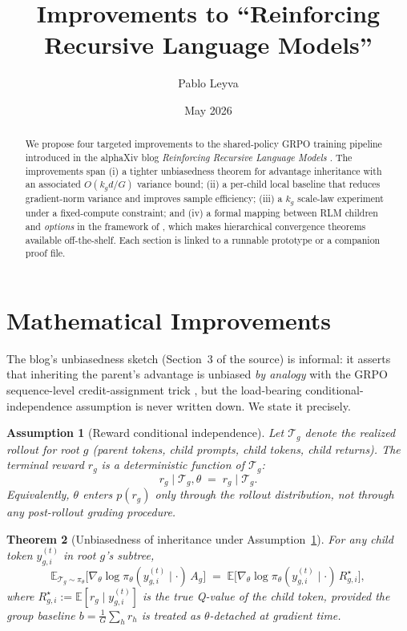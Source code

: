 \documentclass[11pt]{article}
\title{Improvements to ``Reinforcing Recursive Language Models''}
\author{Pablo Leyva}
\date{May 2026}
\newtheorem{theorem}{Theorem}
\newtheorem{assumption}[theorem]{Assumption}
\begin{document}
\maketitle

\begin{abstract}
We propose four targeted improvements to the shared-policy GRPO training
pipeline introduced in the alphaXiv blog \emph{Reinforcing Recursive Language
Models} \citep{zhang2026rlm,skyrl2025}. The improvements span (i) a tighter
unbiasedness theorem for advantage inheritance with an associated $O(k_g d / G)$
variance bound; (ii) a per-child local baseline that reduces gradient-norm
variance and improves sample efficiency; (iii) a $k_g$ scale-law experiment under
a fixed-compute constraint; and (iv) a formal mapping between RLM children and
\emph{options} in the framework of \citet{sutton1999options}, which makes
hierarchical convergence theorems available off-the-shelf. Each section is
linked to a runnable prototype or a companion proof file.
\end{abstract}

\section*{Mathematical Improvements}

The blog's unbiasedness sketch (Section~3 of the source) is informal: it asserts
that inheriting the parent's advantage is unbiased \emph{by analogy} with the
GRPO sequence-level credit-assignment trick \citep{shao2024deepseekmath}, but
the load-bearing conditional-independence assumption is never written down. We
state it precisely.

\begin{assumption}[Reward conditional independence]
\label{ass:cond-indep}
Let $\mathcal{T}_g$ denote the realized rollout for root $g$ (parent tokens,
child prompts, child tokens, child returns). The terminal reward $r_g$ is a
deterministic function of $\mathcal{T}_g$:
\[
  r_g \mid \mathcal{T}_g, \theta \;=\; r_g \mid \mathcal{T}_g.
\]
Equivalently, $\theta$ enters $p(r_g)$ only through the rollout distribution,
not through any post-rollout grading procedure.
\end{assumption}

\begin{theorem}[Unbiasedness of inheritance under Assumption~\ref{ass:cond-indep}]
\label{thm:unbiased}
For any child token $y_{g,i}^{(t)}$ in root $g$'s subtree,
\[
  \mathbb{E}_{\mathcal{T}_g \sim \pi_\theta}
  \bigl[\nabla_\theta \log \pi_\theta(y_{g,i}^{(t)}\mid \cdot)\, A_g\bigr]
  \;=\; \mathbb{E}\bigl[\nabla_\theta \log \pi_\theta(y_{g,i}^{(t)}\mid \cdot)\, R_{g,i}^\star\bigr],
\]
where $R_{g,i}^\star := \mathbb{E}[r_g \mid y_{g,i}^{(t)}]$ is the true Q-value
of the child token, provided the group baseline $b = \tfrac{1}{G}\sum_h r_h$ is
treated as $\theta$-detached at gradient time.
\end{theorem}
\end{document}
